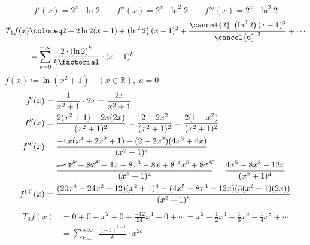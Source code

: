 \documentclass[a4paper,12pt]{article}
\theoremstyle{definition}
\begin{document}
	\begin{solution}
		\begin{tasks}
			\task
			\[
			f'(x) = 2^x \cdot \ln{2} \qquad f''(x) = 2^x \cdot \ln^{2}{2} \qquad f'''(x) = 2^x \cdot \ln^{3}{2}
			\]
			\begin{align*}
				T_{1}f(x) &\coloneq 2 + 2\ln{2} (x-1) + \left( \ln^{2}{2} \right)  (x-1)^2 + \frac{\cancel{2}\ \left(  \ln^{3}{2} \right) (x-1)^3 }{\cancel{6}^{~3}} + \cdots \\
				&= \sum_{k=0}^{+\infty}{\frac{2 \cdot \left( \ln{2} \right)^{k}}{k \factorial} \cdot (x-1)^k}
			\end{align*}
			\task $ f(x) \coloneq \ln{(x^2+1)} \quad (x \in \mathbb{R}), \; a = 0$
			\begin{align*}
				f'(x) &= \frac{1}{x^2+1} \cdot 2x = \frac{2x}{x^2+1} \\
				f''(x) &= \frac{2(x^2+1)-2x(2x)}{(x^2+1)^2} = \frac{2-2x^2}{(x^2+1)^2} = \frac{2(1-x^2)}{(x^2+1)^2} \\
				f'''(x) &= \frac{-4x(x^4+2x^2+1)-(2-2x^2)(4x^3+4x)}{(x^2+1)^4} \\
				&= \frac{\cancel{-4x^5}-\cancel{8x^3}-4x-8x^3-8x+\cancel{8}^{~4}x^5+\cancel{8x^3}}{(x^2+1)^4} = \frac{4x^5-8x^3-12x}{(x^2+1)^4} \\
				f^{(4)}(x) &= \frac{(20x^4-24x^2-12)(x^2+1)^4-(4x^5-8x^3-12x)(3(x^2+1)(2x))}{(x^2+1)^8} \\
			\end{align*}
			\begin{align*}
				T_0f(x) &= 0 + 0 + x^2 + 0 + \frac{-12}{24}x^4 + 0 + \cdots = x^2 - \frac{1}{2}x^4 + \frac{1}{3}x^6 - \frac{1}{4}x^8 + \cdots \\
				&= \sum_{k=1}^{+\infty}{\frac{(-1)^{k+1}}{k} \cdot x^{2k}}
			\end{align*}
		\end{tasks}
	\end{solution}
\end{document}
